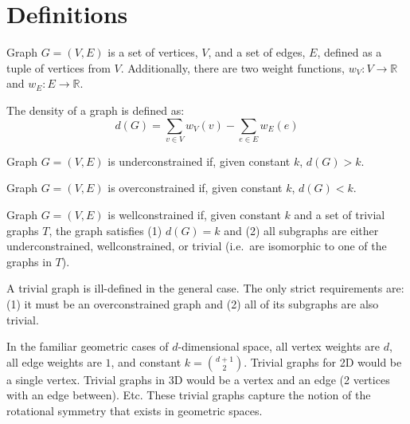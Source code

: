 \documentclass[11pt]{article}
\begin{document}



\pnmaketitle
\pnmakefooter


\section{Definitions}
\begin{definition}[Graph]
Graph $G=(V,E)$ is a set of vertices, $V$, and a set of edges, $E$, defined as a tuple of vertices from $V$. Additionally, there are two weight functions, $w_V: V \to \mathbb{R}$ and $w_E: E \to \mathbb{R}$.
\end{definition}

\begin{definition}[Density]
The density of a graph is defined as:
\[d(G) = \sum_{v\in V}{w_V(v)} - \sum_{e\in E}{w_E(e)}\]
\end{definition}

\begin{definition}
Graph $G=(V,E)$ is underconstrained if, given constant $k$, $d(G) > k$.
\end{definition}

\begin{definition}
Graph $G=(V,E)$ is overconstrained if, given constant $k$, $d(G) < k$.
\end{definition}

\begin{definition}
Graph $G=(V,E)$ is wellconstrained if, given constant $k$ and a set of trivial graphs $T$, the graph satisfies (1) $d(G)=k$ and (2) all subgraphs are either underconstrained, wellconstrained, or trivial (i.e.\ are isomorphic to one of the graphs in $T$).
\end{definition}

\begin{definition}
A trivial graph is ill-defined in the general case. The only strict requirements are: (1) it must be an overconstrained graph and (2) all of its subgraphs are also trivial.

In the familiar geometric cases of $d$-dimensional space, all vertex weights are $d$, all edge weights are $1$, and constant $k= {{d+1}\choose{2}}$. Trivial graphs for 2D would be a single vertex. Trivial graphs in 3D would be a vertex and an edge (2 vertices with an edge between). Etc. These trivial graphs capture the notion of the rotational symmetry that exists in geometric spaces.
\end{definition}
\end{document}
